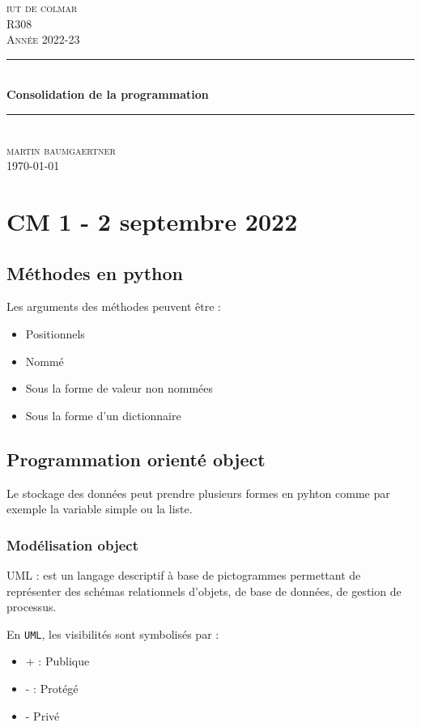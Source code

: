 \documentclass[12pt, a4paper]{article}
\begin{document}
\begin{titlepage}
	\newcommand{\HRule}{\rule{\linewidth}{0.5mm}} 
	\center 
	\textsc{\LARGE iut de colmar}\\[1.5cm] 
	\textsc{\Large R308}\\[0.5cm] 
	\textsc{\large Année 2022-23}\\[0.5cm]
	\HRule\\[0.75cm]
	{\huge\bfseries Consolidation de la programmation}\\[0.4cm]
	\HRule\\[1.5cm]
	\textsc{\large martin baumgaertner}\\[0.5cm] 

	\vfill\vfill\vfill
	{\large\today} 
	\vfill
\end{titlepage}
\newpage
\tableofcontents
\newpage
\section{CM 1 - 2 septembre 2022}

\subsection{Méthodes en python}
    Les arguments des méthodes peuvent être :
        \begin{itemize}
            \item Positionnels
            \item Nommé
            \item  Sous la forme de valeur non nommées
            \item  Sous la forme d'un dictionnaire
        \end{itemize}
    
\subsection{Programmation orienté object}
    Le stockage des données peut prendre plusieurs formes en pyhton comme
    par exemple la variable simple ou la liste. 

    \subsubsection{Modélisation object}
    UML : est un langage descriptif à base de pictogrammes permettant de
    représenter des schémas relationnels d'objets, de base de données, de gestion
    de processus. 

    En \texttt{UML}, les visibilités sont symbolisés par :
    \begin{itemize}
        \item + : Publique
        \item - : Protégé
        \item - Privé
    \end{itemize}
    
\end{document}
